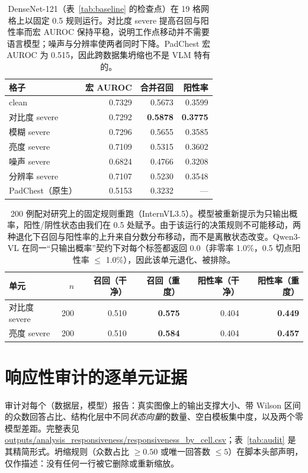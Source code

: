 \begin{table}[t]
\centering
\small
\caption{DenseNet-121（表~\ref{tab:baseline} 的检查点）在 19 格网格上以固定 0.5 规则运行。对比度 severe 提高召回与阳性率而宏 AUROC 保持平稳，说明工作点移动并不需要语言模型；噪声与分辨率使两者同时下降。PadChest 宏 AUROC 为 0.515，因此跨数据集坍缩也不是 VLM 特有的。}
\label{tab:densenetgrid}
\begin{tabular}{lrrr}
\toprule
格子 & 宏 AUROC & 合并召回 & 阳性率 \\
\midrule
clean & 0.7329 & 0.5673 & 0.3599 \\
对比度 severe & 0.7292 & \textbf{0.5878} & \textbf{0.3775} \\
模糊 severe & 0.7296 & 0.5655 & 0.3585 \\
亮度 severe & 0.7109 & 0.5315 & 0.3602 \\
噪声 severe & 0.6824 & 0.4766 & 0.3208 \\
分辨率 severe & 0.7107 & 0.5230 & 0.3548 \\
PadChest（原生） & 0.5153 & 0.3232 & --- \\
\bottomrule
\end{tabular}
\end{table}

\begin{table}[H]
\centering
\small
\caption{200 例配对研究上的固定规则重跑（InternVL3.5）。模型被重新提示为只输出概率，阳性/阴性状态由我们在 0.5 处赋予。由于该运行的决策规则不可能移动，两种退化下召回与阳性率的上升来自分数分布移动，而不是离散状态改变。Qwen3-VL 在同一``只输出概率''契约下对每个标签都返回 0.0（非零率 1.0\%，0.5 切点阳性率 $\le$ 1.0\%），因此该单元退化、被排除。}
\label{tab:fixedrerun}
\begin{tabular}{lrrrrr}
\toprule
单元 & $n$ & 召回（干净） & 召回（重度） & 阳性率（干净） & 阳性率（重度） \\
\midrule
对比度 severe & 200 & 0.510 & \textbf{0.575} & 0.404 & \textbf{0.449} \\
亮度 severe & 200 & 0.510 & \textbf{0.584} & 0.404 & \textbf{0.457} \\
\bottomrule
\end{tabular}
\end{table}

\section{响应性审计的逐单元证据}
\label{app:cell}

审计对每个（数据层，模型）报告：真实图像上的输出支撑大小、带 Wilson 区间的众数回答占比、结构化层中不同\emph{状态向量}的数量、空白模板集中度，以及两个零模型差距。完整表见 \url{outputs/analysis_responsiveness/responsiveness_by_cell.csv}；表~\ref{tab:audit} 是其精简形式。坍缩规则（众数占比 $\ge 0.50$ 或唯一回答数 $\le 5$）在脚本头部声明，仅作描述：没有任何一行被它删除或重新缩放。


